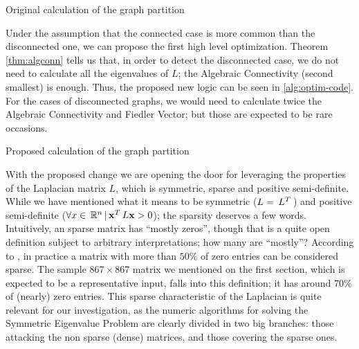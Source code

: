 \begin{algorithm}
  \label{alg:orig-code}
  \caption{Original calculation of the graph partition}
%
  \DontPrintSemicolon
%
%
%
     \;
%    
    {
    }
    \Else
    {
    }
\end{algorithm}
\hfill

Under the assumption that the connected case is more common than the
disconnected one, we can propose the first high level
optimization. Theorem \cref{thm:algconn} tells us that, in order to
detect the disconnected case, we do not need  to calculate all the
eigenvalues of $L$; the Algebraic Connectivity (second smallest) is
enough. Thus, the proposed new logic can be seen in
\cref{alg:optim-code}. For the cases of disconnected graphs, we would need to
calculate twice the Algebraic Connectivity and Fiedler Vector; but
those are expected to be rare occasions. 

\begin{algorithm}
  \label{alg:optim-code}
  \caption{Proposed calculation of the graph partition}
%
  \DontPrintSemicolon
%
%
%
     \;
%    
    {
       \;      
    }
    \Else
    {
    }
\end{algorithm}
\hfill

With the proposed change we are opening the door for leveraging the
properties of the Laplacian matrix $L$, which is symmetric, sparse and
positive semi-definite. While we have mentioned what it means to be
symmetric ($L = \,{L}^{T}\,$) and positive semi-definite ($\forall x \in
\,\mathbb{R}^{n}\, | \,{\mathbf{x}}^{T}\,L\mathbf{x} > 0$); the sparsity deserves a few
words. Intuitively, an sparse matrix has ``mostly zeros'', though that
is a quite open definition subject to arbitrary interpretations; how many
are ``mostly''? According to \cite{richard12}, in practice a matrix
with more than $50$\% of zero entries can be considered sparse. The
sample $867 \times 867$ matrix we mentioned on the first section,
which is expected to be a representative input, falls into this
definition; it has around $70$\% of (nearly) zero entries. This
sparse characteristic of the Laplacian is quite relevant for our
investigation, as the numeric algorithms for solving the Symmetric
Eigenvalue Problem are clearly divided in two big branches: those
attacking the non sparse (dense) matrices, and those covering the
sparse ones. \\

